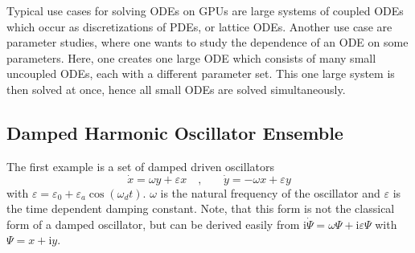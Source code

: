 \documentclass[1p]{elsarticle}
\newcommand {\ii} {\text{i}}
\begin{document}
Typical use cases for solving ODEs on GPUs are large systems of
coupled ODEs which occur as discretizations of PDEs, or lattice
ODEs. Another use case are parameter studies, where one wants to study
the dependence of an ODE on some parameters. Here, one creates one
large ODE which consists of many small uncoupled ODEs, each with a
different parameter set. This one large system is then solved at once,
hence all small ODEs are solved simultaneously.




%
%
\subsection{Damped Harmonic Oscillator Ensemble}

The first example is a set of damped driven oscillators
\begin{equation} \label{eq:dampedsystem}
    \dot{x} = \omega y + \varepsilon x \quad \text{,} \quad \quad
    \dot{y} = -\omega x + \varepsilon y
\end{equation}
with $\varepsilon = \varepsilon_0 + \varepsilon_a \cos \left( \omega_d
t \right)$. $\omega$ is the natural frequency of the oscillator and
$\varepsilon$ is the time dependent damping constant.  Note, that this form is
not the classical form of a damped oscillator, but can be derived easily from
$\ii \dot{\Psi} = \omega \Psi + \ii \varepsilon \Psi$ with $\Psi = x + \ii y$.
\end{document}
